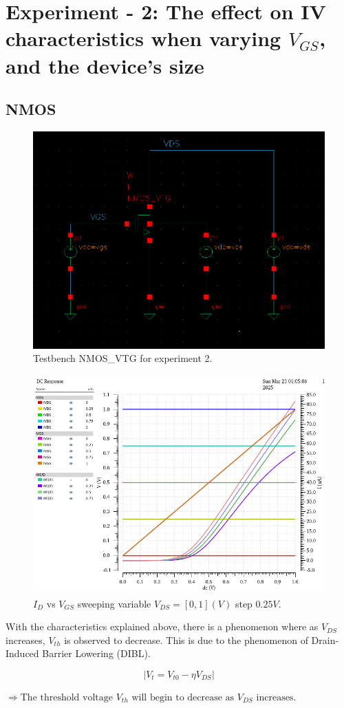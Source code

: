 \newpage
\section{Experiment - 2: The effect on IV characteristics when varying $V_{GS}$, and the device's size}
\subsection{NMOS}
\begin{figure}[H]
	\centering
	\includegraphics[width = 0.6\linewidth]{sections/pic/EX2_NMOS.png}
	\caption{Testbench NMOS\_VTG for experiment 2.}
	\label{f_ex2NMOS-schematic}
\end{figure}


\begin{figure}[H]
	\centering
	\includegraphics[width = .6\linewidth]{sections/pic/EX2_NMOS_Id&Vgs(Vds_0_1_0_25)(w)(l).png}
	\caption{$I_D$ vs $V_{GS}$ sweeping variable $V_{DS} = [0, 1](V)$ step $0.25V$.}
	\label{f_EX2_NMOS_Id&Vgs(Vds_0_1_0_25)(w)(l)}
\end{figure}

\begin{discussion}
	\item With the characteristics explained above, there is a phenomenon where as \( V_{DS} \) increases, \( V_{th} \) is observed to decrease. This is due to the phenomenon of Drain-Induced Barrier Lowering (DIBL).  
	
	\[ |V_{t} = V_{t0} - \eta V_{DS}| \]
	
	$\Rightarrow \text{The threshold voltage } V_{th} \text{ will begin to decrease as } V_{DS} \text{ increases.}$
	
\end{discussion}

